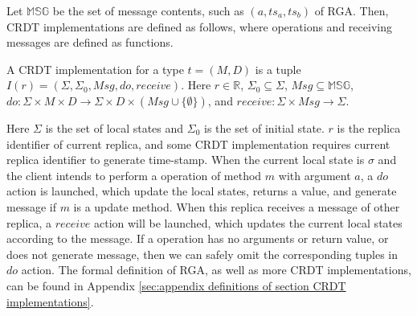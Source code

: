 Let $\mathbb{MSG}$ be the set of message contents, such as $(a,ts_a,ts_b)$ of RGA. Then, CRDT implementations are defined as follows, where operations and receiving messages are defined as functions.

\begin{definition}
\label{definition:operation-based CRDT implementations}
A CRDT implementation for a type $t = (M,D)$ is a tuple $I(r) = (\Sigma, \Sigma_0, \mathit{Msg}, \mathit{do},\mathit{receive})$. Here $r \in \mathbb{R}$, $\Sigma_0 \subseteq \Sigma$, $\mathit{Msg} \subseteq \mathbb{MSG}$, $\mathit{do}:\Sigma \times M \times D \rightarrow \Sigma \times D \times (\mathit{Msg} \cup \{ \emptyset \} )$, and $\mathit{receive}: \Sigma \times \mathit{Msg} \rightarrow \Sigma$.
\end{definition}

Here $\Sigma$ is the set of local states and $\Sigma_0$ is the set of initial state. $r$ is the replica identifier of current replica, and some CRDT implementation requires current replica identifier to generate time-stamp. When the current local state is $\sigma$ and the client intends to perform a operation of method $m$ with argument $a$, a $\mathit{do}$ action is launched, which update the local states, returns a value, and generate message if $m$ is a update method. When this replica receives a message of other replica, a $\mathit{receive}$ action will be launched, which updates the current local states according to the message. If a operation has no arguments or return value, or does not generate message, then we can safely omit the corresponding tuples in $\mathit{do}$ action.
The formal definition of RGA, as well as more CRDT implementations, can be found in  Appendix \ref{sec:appendix definitions of section CRDT implementations}.

















